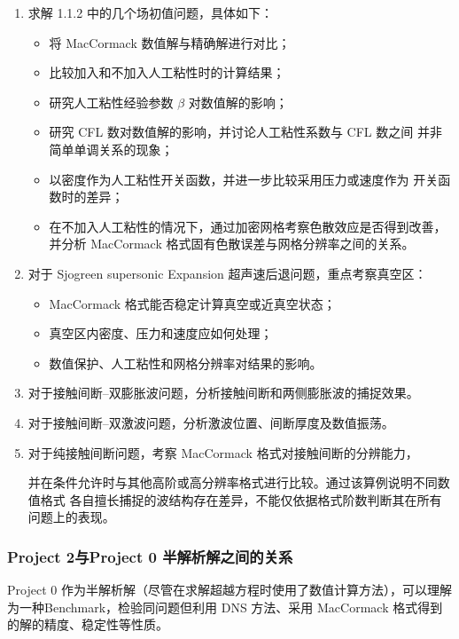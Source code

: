 \begin{enumerate}[leftmargin=2em]
    \item 求解 1.1.2 中的几个场初值问题，具体如下：
    \begin{itemize}
        \item 将 MacCormack 数值解与精确解进行对比；
        \item 比较加入和不加入人工粘性时的计算结果；
        \item 研究人工粘性经验参数 $\beta$ 对数值解的影响；
        \item 研究 CFL 数对数值解的影响，并讨论人工粘性系数与 CFL 数之间
        并非简单单调关系的现象；
        \item 以密度作为人工粘性开关函数，并进一步比较采用压力或速度作为
        开关函数时的差异；
        \item 在不加入人工粘性的情况下，通过加密网格考察色散效应是否得到改善，
        并分析 MacCormack 格式固有色散误差与网格分辨率之间的关系。
    \end{itemize}

    \item 对于 Sjogreen supersonic Expansion 超声速后退问题，重点考察真空区：
    \begin{itemize}
        \item MacCormack 格式能否稳定计算真空或近真空状态；
        \item 真空区内密度、压力和速度应如何处理；
        \item 数值保护、人工粘性和网格分辨率对结果的影响。
    \end{itemize}

    \item 对于接触间断--双膨胀波问题，分析接触间断和两侧膨胀波的捕捉效果。

    \item 对于接触间断--双激波问题，分析激波位置、间断厚度及数值振荡。

    \item 对于纯接触间断问题，考察 MacCormack 格式对接触间断的分辨能力，

    并在条件允许时与其他高阶或高分辨率格式进行比较。通过该算例说明不同数值格式
    各自擅长捕捉的波结构存在差异，不能仅依据格式阶数判断其在所有问题上的表现。
\end{enumerate}

\subsubsection{Project 2与Project 0 半解析解之间的关系}
Project 0 作为半解析解（尽管在求解超越方程时使用了数值计算方法），可以理解为一种Benchmark，检验同问题但利用 DNS 方法、采用 MacCormack 格式得到的解的精度、稳定性等性质。

